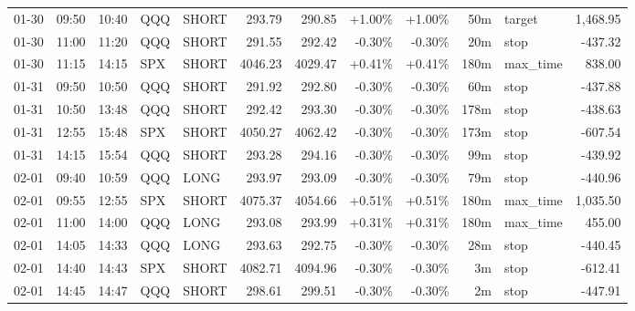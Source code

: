 \documentclass[11pt,a4paper,twoside]{article}
\begin{document}
\begin{center}
\begin{longtable}{>{\color{txtmain}}l l l l l r r r r r >{\color{txtmain}}l r}
01-30 & 09:50 & 10:40 & QQQ & SHORT & 293.79 & 290.85 & \textcolor{wingreen}{+1.00\%} & \textcolor{wingreen}{+1.00\%} & 50m & target & \textcolor{wingreen}{1,468.95} \\
01-30 & 11:00 & 11:20 & QQQ & SHORT & 291.55 & 292.42 & \textcolor{lossred}{-0.30\%} & \textcolor{lossred}{-0.30\%} & 20m & stop & \textcolor{lossred}{-437.32} \\
01-30 & 11:15 & 14:15 & SPX & SHORT & 4046.23 & 4029.47 & \textcolor{wingreen}{+0.41\%} & \textcolor{wingreen}{+0.41\%} & 180m & max\_time & \textcolor{wingreen}{838.00} \\
01-31 & 09:50 & 10:50 & QQQ & SHORT & 291.92 & 292.80 & \textcolor{lossred}{-0.30\%} & \textcolor{lossred}{-0.30\%} & 60m & stop & \textcolor{lossred}{-437.88} \\
01-31 & 10:50 & 13:48 & QQQ & SHORT & 292.42 & 293.30 & \textcolor{lossred}{-0.30\%} & \textcolor{lossred}{-0.30\%} & 178m & stop & \textcolor{lossred}{-438.63} \\
01-31 & 12:55 & 15:48 & SPX & SHORT & 4050.27 & 4062.42 & \textcolor{lossred}{-0.30\%} & \textcolor{lossred}{-0.30\%} & 173m & stop & \textcolor{lossred}{-607.54} \\
01-31 & 14:15 & 15:54 & QQQ & SHORT & 293.28 & 294.16 & \textcolor{lossred}{-0.30\%} & \textcolor{lossred}{-0.30\%} & 99m & stop & \textcolor{lossred}{-439.92} \\
02-01 & 09:40 & 10:59 & QQQ & LONG & 293.97 & 293.09 & \textcolor{lossred}{-0.30\%} & \textcolor{lossred}{-0.30\%} & 79m & stop & \textcolor{lossred}{-440.96} \\
02-01 & 09:55 & 12:55 & SPX & SHORT & 4075.37 & 4054.66 & \textcolor{wingreen}{+0.51\%} & \textcolor{wingreen}{+0.51\%} & 180m & max\_time & \textcolor{wingreen}{1,035.50} \\
02-01 & 11:00 & 14:00 & QQQ & LONG & 293.08 & 293.99 & \textcolor{wingreen}{+0.31\%} & \textcolor{wingreen}{+0.31\%} & 180m & max\_time & \textcolor{wingreen}{455.00} \\
02-01 & 14:05 & 14:33 & QQQ & LONG & 293.63 & 292.75 & \textcolor{lossred}{-0.30\%} & \textcolor{lossred}{-0.30\%} & 28m & stop & \textcolor{lossred}{-440.45} \\
02-01 & 14:40 & 14:43 & SPX & SHORT & 4082.71 & 4094.96 & \textcolor{lossred}{-0.30\%} & \textcolor{lossred}{-0.30\%} & 3m & stop & \textcolor{lossred}{-612.41} \\
02-01 & 14:45 & 14:47 & QQQ & SHORT & 298.61 & 299.51 & \textcolor{lossred}{-0.30\%} & \textcolor{lossred}{-0.30\%} & 2m & stop & \textcolor{lossred}{-447.91} \\

\end{longtable}
\end{center}
\end{document}
